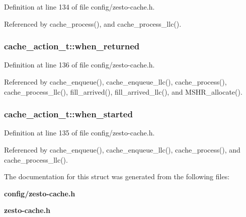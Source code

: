 Definition at line 134 of file config/zesto-cache.h.

Referenced by cache\_\-process(), and cache\_\-process\_\-llc().
\subsubsection[{when\_\-returned}]{ {\bf cache\_\-action\_\-t::when\_\-returned}}\label{structcache__action__t_219a035d39a86a1f163fb393186bac58}




Definition at line 136 of file config/zesto-cache.h.

Referenced by cache\_\-enqueue(), cache\_\-enqueue\_\-llc(), cache\_\-process(), cache\_\-process\_\-llc(), fill\_\-arrived(), fill\_\-arrived\_\-llc(), and MSHR\_\-allocate().
\subsubsection[{when\_\-started}]{ {\bf cache\_\-action\_\-t::when\_\-started}}\label{structcache__action__t_0a0836c30c99e8ff294fdac34f778112}




Definition at line 135 of file config/zesto-cache.h.

Referenced by cache\_\-enqueue(), cache\_\-enqueue\_\-llc(), cache\_\-process(), and cache\_\-process\_\-llc().

The documentation for this struct was generated from the following files:\begin{CompactItemize}
\item 
{\bf config/zesto-cache.h}\item 
{\bf zesto-cache.h}\end{CompactItemize}
